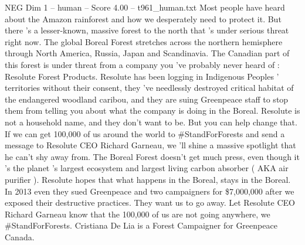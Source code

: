 \begin{textsample}{NEG Dim 1 – human – Score 4.00 – t961\_human.txt}  \label{ex:f1_neg_047}
Most people have heard about the Amazon rainforest and how we desperately need to protect it.
But there ’s a lesser-known, massive forest to the north that ’s under serious threat right now.
The global Boreal Forest stretches across the northern hemisphere through North America, Russia, Japan and Scandinavia.
The Canadian part of this forest is under threat from a company you ’ve probably never heard of : Resolute Forest Products.
Resolute has been logging in Indigenous Peoples ’ territories without their consent, they ’ve needlessly destroyed critical habitat of the endangered woodland caribou, and they are suing Greenpeace staff to stop them from telling you about what the company is doing in the Boreal.
Resolute is not a household name, and they don't want to be.
But you can help change that.
If we can get 100,000 of us around the world to \#StandForForests and send a message to Resolute CEO Richard Garneau, we ’ll shine a massive spotlight that he can't shy away from.
The Boreal Forest doesn't get much press, even though it ’s the planet ’s largest ecosystem and largest living carbon absorber ( AKA air purifier ).
Resolute hopes that what happens in the Boreal, stays in the Boreal.
In 2013 even they sued Greenpeace and two campaigners for \$7,000,000 after we exposed their destructive practices.
They want us to go away.
Let Resolute CEO Richard Garneau know that the 100,000 of us are not going anywhere, we \#StandForForests.
Cristiana De Lia is a Forest Campaigner for Greenpeace Canada.

\end{textsample}
